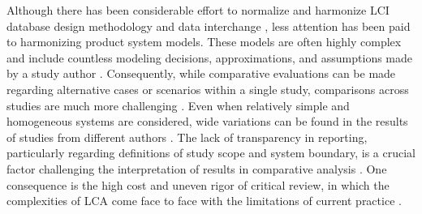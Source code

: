 Although there has been considerable effort to normalize and harmonize %
LCI database design methodology and data interchange \citep{UNEP_2011, JRC_ILCD_ELCD_2013, Mila_e_Canals_2015, Ingwersen_JLCA_2015}, less attention has been paid to harmonizing product system models.  These models are often highly complex and include countless modeling decisions, approximations, and assumptions made by a study author \citep{Lloyd2007, reap2008_I}.  Consequently, while comparative evaluations can be made regarding alternative cases or scenarios within a single study, comparisons across studies are much more challenging \citep{Heath2012, Henriksson2014}.  Even when relatively simple and homogeneous systems are considered, wide variations can be found in the results of studies from different authors \citep{van_der_Harst_2013, Turconi_2013}.
The lack of transparency in reporting,
particularly regarding definitions of study scope and system boundary,
is a crucial factor challenging the interpretation of results in comparative analysis \citep{Cleary2009, Laurent_2014}.
One consequence
is the high cost and uneven rigor of critical review, in which the complexities of LCA come face to face with the limitations of current practice \citep{Curran2014}.  

